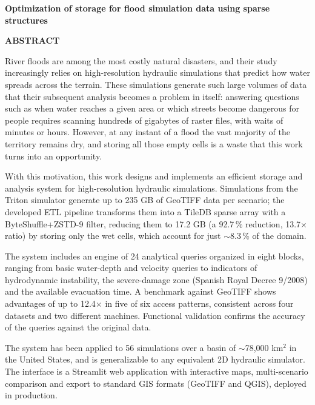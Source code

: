 \begin{center}
{\Large \bfseries Optimization of storage for flood simulation data using sparse structures}

\vspace{1cm}
{\Large \bfseries ABSTRACT}

\vspace{1.5cm}
\end{center}


River floods are among the most costly natural disasters, and their study increasingly relies on high-resolution hydraulic simulations that predict how water spreads across the terrain. These simulations generate such large volumes of data that their subsequent analysis becomes a problem in itself: answering questions such as when water reaches a given area or which streets become dangerous for people requires scanning hundreds of gigabytes of raster files, with waits of minutes or hours. However, at any instant of a flood the vast majority of the territory remains dry, and storing all those empty cells is a waste that this work turns into an opportunity.

With this motivation, this work designs and implements an efficient storage and analysis system for high-resolution hydraulic simulations. Simulations from the Triton simulator generate up to 235 GB of GeoTIFF data per scenario; the developed ETL pipeline transforms them into a TileDB sparse array with a ByteShuffle+ZSTD-9 filter, reducing them to 17.2 GB (a 92.7\,\% reduction, 13.7$\times$ ratio) by storing only the wet cells, which account for just $\sim$8.3\,\% of the domain.

The system includes an engine of 24 analytical queries organized in eight blocks, ranging from basic water-depth and velocity queries to indicators of hydrodynamic instability, the severe-damage zone (Spanish Royal Decree 9/2008) and the available evacuation time. A benchmark against GeoTIFF shows advantages of up to 12.4$\times$ in five of six access patterns, consistent across four datasets and two different machines. Functional validation confirms the accuracy of the queries against the original data.

The system has been applied to 56 simulations over a basin of $\sim$78,000 km$^2$ in the United States, and is generalizable to any equivalent 2D hydraulic simulator. The interface is a Streamlit web application with interactive maps, multi-scenario comparison and export to standard GIS formats (GeoTIFF and QGIS), deployed in production.


